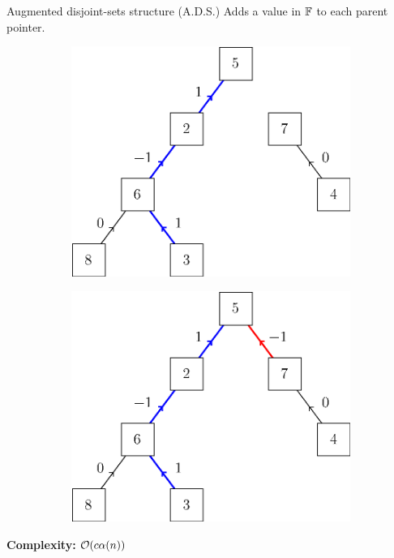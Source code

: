 \begin{frame}{Augmented disjoint-sets structure (A.D.S.)}
	Adds a value in $\mathbb{F}$ to each parent pointer.
	\begin{figure}
		\centering
		\begin{subfigure}{0.45\textwidth}
			\includegraphics[width=\linewidth]{ds/augmented_disjoint_find}
		\end{subfigure}%
		\hspace{0.045\textwidth}%
		\vline%
		\hspace{0.045\textwidth}%
		\begin{subfigure}{0.45\textwidth}
			\includegraphics[width=\linewidth]{ds/augmented_disjoint_link}
		\end{subfigure}%
	\end{figure}
	\textbf{Complexity:} $\mathcal{O}(c \alpha(n))$
\end{frame}

